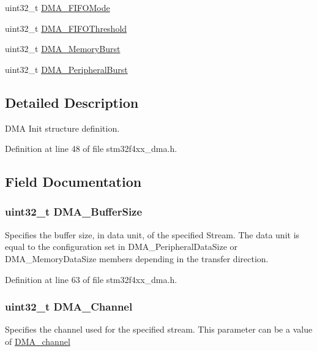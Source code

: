 \begin{DoxyCompactItemize}
\item 
uint32\-\_\-t \hyperlink{struct_d_m_a___init_type_def_a684555f9f5644259b7c4ca446b6dcf8f}{D\-M\-A\-\_\-\-F\-I\-F\-O\-Mode}
\item 
uint32\-\_\-t \hyperlink{struct_d_m_a___init_type_def_a2bbb3ea272279aa5cddef702e153a09d}{D\-M\-A\-\_\-\-F\-I\-F\-O\-Threshold}
\item 
uint32\-\_\-t \hyperlink{struct_d_m_a___init_type_def_a90987eb939726acf365f2bf039a51725}{D\-M\-A\-\_\-\-Memory\-Burst}
\item 
uint32\-\_\-t \hyperlink{struct_d_m_a___init_type_def_a6772e281310a3e93781364c723984138}{D\-M\-A\-\_\-\-Peripheral\-Burst}
\end{DoxyCompactItemize}


\subsection{Detailed Description}
D\-M\-A Init structure definition. 

Definition at line 48 of file stm32f4xx\-\_\-dma.\-h.



\subsection{Field Documentation}
\hypertarget{struct_d_m_a___init_type_def_ad5e4b9069a7a145b3312d54d09059f78}{
\subsubsection[{D\-M\-A\-\_\-\-Buffer\-Size}]{\setlength{\rightskip}{0pt plus 5cm}uint32\-\_\-t D\-M\-A\-\_\-\-Buffer\-Size}}\label{struct_d_m_a___init_type_def_ad5e4b9069a7a145b3312d54d09059f78}
Specifies the buffer size, in data unit, of the specified Stream. The data unit is equal to the configuration set in D\-M\-A\-\_\-\-Peripheral\-Data\-Size or D\-M\-A\-\_\-\-Memory\-Data\-Size members depending in the transfer direction. 

Definition at line 63 of file stm32f4xx\-\_\-dma.\-h.

\hypertarget{struct_d_m_a___init_type_def_afae070f2d49543b1acd3e318c6de8527}{
\subsubsection[{D\-M\-A\-\_\-\-Channel}]{\setlength{\rightskip}{0pt plus 5cm}uint32\-\_\-t D\-M\-A\-\_\-\-Channel}}\label{struct_d_m_a___init_type_def_afae070f2d49543b1acd3e318c6de8527}
Specifies the channel used for the specified stream. This parameter can be a value of \hyperlink{group___d_m_a__channel}{D\-M\-A\-\_\-channel} 

